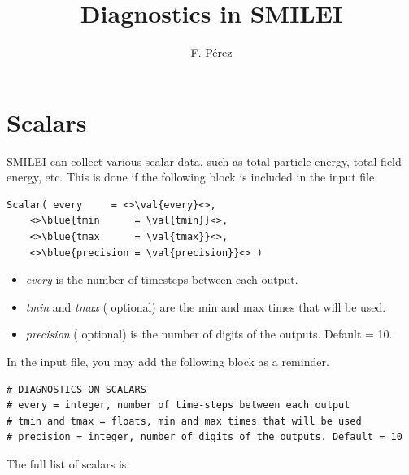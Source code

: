 \documentclass[11pt]{article}
\newcommand{\val}[1]{{\ttfamily \textit{#1}}}
\newcommand{\blue}[1]{{\color{blue} #1}}
\begin{document}
\title{Diagnostics in SMILEI}
\author{F. P\'erez}
\maketitle

\setcounter{tocdepth}{2}
\tableofcontents

\clearpage


\section{Scalars\label{sec:scalars}}

SMILEI can collect various scalar data, such as total particle energy, total field energy, etc.
This is done if the following block is included in the input file.

\begin{lstlisting}
Scalar( every     = <>\val{every}<>,
	<>\blue{tmin      = \val{tmin}}<>,
	<>\blue{tmax      = \val{tmax}}<>,
	<>\blue{precision = \val{precision}}<> )
\end{lstlisting}
\vspace{-1em}
\begin{itemize}
\item\val{every} is the number of timesteps between each output.
\item\val{tmin} and \val{tmax} (\blue{optional}) are the min and max times that will be used.
\item\val{precision} (\blue{optional}) is the number of digits of the outputs. Default = 10.
\end{itemize}
\vfill
In the input file, you may add the following block as a reminder.
\begin{lstlisting}
# DIAGNOSTICS ON SCALARS
# every = integer, number of time-steps between each output
# tmin and tmax = floats, min and max times that will be used
# precision = integer, number of digits of the outputs. Default = 10
\end{lstlisting}
\vfill
The full list of scalars is:\\
\vspace{-0.7em}
\end{document}
